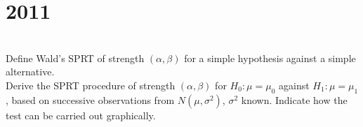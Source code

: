 \section*{2011}
\vspace{-.5cm}
\hrulefill \smallskip\\
 Define Wald's SPRT of strength $(\alpha,\beta)$ for a simple hypothesis against a simple alternative. \smallskip\\ Derive the SPRT procedure of strength $(\alpha,\beta)$ for $H_0: \mu = \mu_0$ against $H_1:\mu = \mu_1$, based on successive observations from $N(\mu,\sigma^2)$, $\sigma^2$ known. Indicate how the test can be carried out graphically.